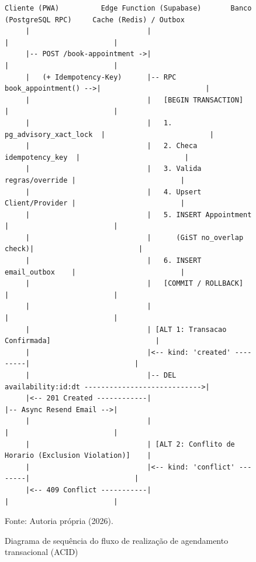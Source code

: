 \documentclass[12pt,a4paper]{article}
\begin{document}
\begin{figure}[hbt]
\centering
\begin{lstlisting}
Cliente (PWA)          Edge Function (Supabase)       Banco (PostgreSQL RPC)     Cache (Redis) / Outbox
     |                            |                             |                         |
     |-- POST /book-appointment ->|                             |                         |
     |   (+ Idempotency-Key)      |-- RPC book_appointment() -->|                         |
     |                            |   [BEGIN TRANSACTION]       |                         |
     |                            |   1. pg_advisory_xact_lock  |                         |
     |                            |   2. Checa idempotency_key  |                         |
     |                            |   3. Valida regras/override |                         |
     |                            |   4. Upsert Client/Provider |                         |
     |                            |   5. INSERT Appointment     |                         |
     |                            |      (GiST no_overlap check)|                         |
     |                            |   6. INSERT email_outbox    |                         |
     |                            |   [COMMIT / ROLLBACK]       |                         |
     |                            |                             |                         |
     |                            | [ALT 1: Transacao Confirmada]                         |
     |                            |<-- kind: 'created' ---------|                         |
     |                            |-- DEL availability:id:dt ---------------------------->|
     |<-- 201 Created ------------|                             |-- Async Resend Email -->|
     |                            |                             |                         |
     |                            | [ALT 2: Conflito de Horario (Exclusion Violation)]    |
     |                            |<-- kind: 'conflict' --------|                         |
     |<-- 409 Conflict -----------|                             |                         |
\end{lstlisting}
\caption{Diagrama de sequência do fluxo de realização de agendamento transacional (ACID)}
\label{fig:seq_escrita}
\vspace{0.1cm}
{\footnotesize Fonte: Autoria própria (2026).}
\end{figure}
\end{document}
